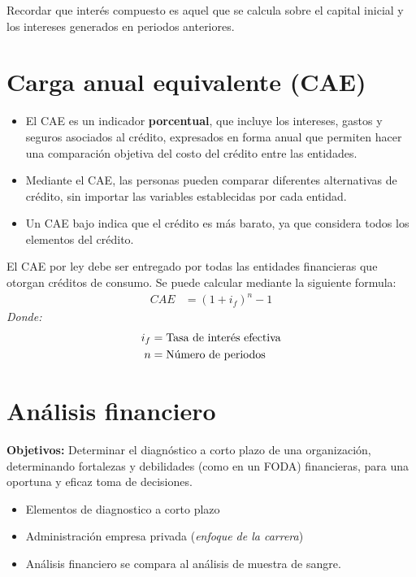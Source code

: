 \documentclass{templateNote}
\begin{document}
\begin{tcolorbox}[colback=orange!10!white,colframe=orange!60!black,title=Observación]
    Recordar que interés compuesto es aquel que se calcula sobre el capital inicial y los intereses generados en periodos anteriores.
\end{tcolorbox}

\section{Carga anual equivalente (CAE)}
\begin{itemize}
    \item El CAE es un indicador \textbf{porcentual}, que incluye los intereses, gastos y seguros asociados al crédito, expresados en forma anual que 
        permiten hacer una comparación objetiva del costo del crédito entre las entidades.
    \item Mediante el CAE, las personas pueden comparar diferentes alternativas de crédito, sin importar las variables establecidas por cada entidad.
    \item Un CAE bajo indica que el crédito es más barato, ya que considera todos los elementos del crédito.
\end{itemize}
\noindent El CAE por ley debe ser entregado por todas las entidades financieras que otorgan créditos de consumo. Se puede calcular mediante la siguiente formula:
\begin{align*}
    CAE &= (1+i_f)^n - 1
\end{align*}
\textit{Donde:}
\begin{align*}
    i_f &= \textnormal{Tasa de interés efectiva}\\
    n &= \textnormal{Número de periodos}
\end{align*}
\newpage

\section{Análisis financiero}
\noindent \textbf{Objetivos:} Determinar el diagnóstico a corto plazo de una organización, determinando fortalezas y debilidades (como en un FODA) 
    financieras, para una oportuna y eficaz toma de decisiones.\\ 
\begin{itemize}
    \item Elementos de diagnostico a corto plazo
    \item Administración empresa privada (\textit{enfoque de la carrera})
    \item Análisis financiero se compara al análisis de muestra de sangre.
\end{itemize}
\end{document}
